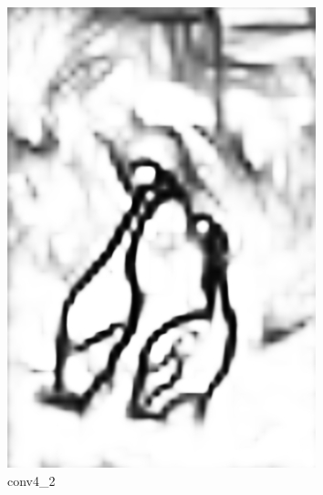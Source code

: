 \documentclass[a4paper]{ctexart}
\begin{document}
\begin{figure}[htb]
\begin{subfigure}{0.2\textwidth}
			\includegraphics[width=\linewidth]{picture/LLIE/RCF/conv4_2}
			\captionsetup{font=scriptsize}
			\caption{conv4\_2}
			\label{fig: conv4_2}	
		\end{subfigure}
		\begin{subfigure}{0.2\textwidth}

\end{subfigure}
\end{figure}
\end{document}
